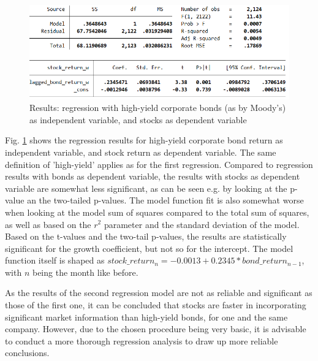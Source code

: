 \begin{figure}[h]
	\centering
	\includegraphics[trim={0 0 0 0},clip,width=1.0\linewidth]{figures/regression-results/regression-high-yield-ccc-d-moodies-stocks-as-dependent.PNG}
	\caption{Results: regression with high-yield corporate bonds (as by Moody's) as independent variable, and stocks as dependent variable}
	\label{fig:regression-high-yield-ccc-d-moodies-stocks-as-dependent.PNG}
\end{figure}

Fig. \ref{fig:regression-high-yield-ccc-d-moodies-stocks-as-dependent.PNG} shows the regression results for high-yield corporate bond return as independent variable, and stock return as dependent variable. The same definition of 'high-yield' applies as for the first regression. Compared to regression results with bonds as dependent variable, the results with stocks as dependent variable are somewhat less significant, as can be seen e.g. by looking at the p-value an the two-tailed p-values. The model function fit is also somewhat worse when looking at the model sum of squares compared to the total sum of squares, as well as based on the $r^2$ parameter and the standard deviation of the model. Based on the t-values and the two-tail p-values, the results are statistically significant for the growth coefficient, but not so for the intercept. The model function itself is shaped as $stock\_return_{n} = -0.0013 + 0.2345 * bond\_return_{n-1}$, with $n$ being the month like before. 

As the results of the second regression model are not as reliable and significant as those of the first one, it can be concluded that stocks are faster in incorporating significant market information than high-yield bonds, for one and the same company. However, due to the chosen procedure being very basic, it is advisable to conduct a more thorough regression analysis to draw up more reliable conclusions. 



